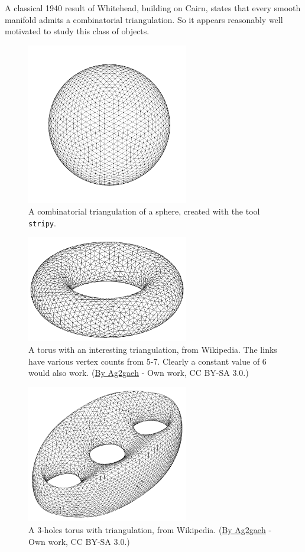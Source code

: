 A classical 1940 result of Whitehead, building on Cairn, states that every smooth manifold admits a combinatorial triangulation\cite{whitehead_triangulation}. So it appears reasonably well motivated to study this class of objects.

\begin{figure}[htbp]
\centering
\includegraphics[width=200pt]{triangulated_sphere.pdf}
\caption{A combinatorial triangulation of a sphere, created with the tool \texttt{stripy}.}
\label{fig:sphere_triangulation}
\end{figure}

\begin{figure}[htbp]
\centering
\includegraphics[width=200pt]{Torus-triang.png}
\caption{A torus with an interesting triangulation, from Wikipedia. The links have various vertex counts from 5-7. Clearly a constant value of 6 would also work. (\href{https://commons.wikimedia.org/w/index.php?curid=30856793}{By Ag2gaeh} - Own work, CC BY-SA 3.0.)}
\label{fig:torus_wiki_triangulation}
\end{figure}

\begin{figure}[htbp]
\centering
\includegraphics[width=200pt]{triangulated_genus3.pdf}
\caption{A 3-holes torus with triangulation, from Wikipedia. (\href{https://commons.wikimedia.org/wiki/File:Tri-brezel.svg}{By Ag2gaeh} - Own work, CC BY-SA 3.0.)}
\label{fig:genus3_wiki_triangulation}
\end{figure}

